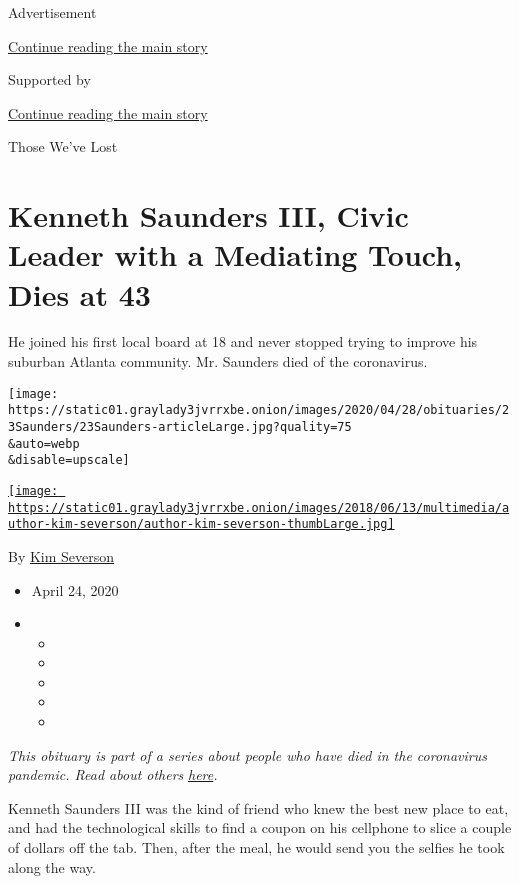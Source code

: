 Advertisement

\protect\hyperlink{after-top}{Continue reading the main story}

Supported by

\protect\hyperlink{after-sponsor}{Continue reading the main story}

Those We've Lost

\hypertarget{kenneth-saunders-iii-civic-leader-with-a-mediating-touch-dies-at-43}{%
\section{Kenneth Saunders III, Civic Leader with a Mediating Touch, Dies
at
43}\label{kenneth-saunders-iii-civic-leader-with-a-mediating-touch-dies-at-43}}

He joined his first local board at 18 and never stopped trying to
improve his suburban Atlanta community. Mr. Saunders died of the
coronavirus.

\texttt{[image: https://static01.graylady3jvrrxbe.onion/images/2020/04/28/obituaries/23Saunders/23Saunders-articleLarge.jpg?quality=75\\\&auto=webp\\\&disable=upscale]}

\href{https://www.nytimes3xbfgragh.onion/by/kim-severson}{\texttt{[image: https://static01.graylady3jvrrxbe.onion/images/2018/06/13/multimedia/author-kim-severson/author-kim-severson-thumbLarge.jpg]}}

By \href{https://www.nytimes3xbfgragh.onion/by/kim-severson}{Kim
Severson}

\begin{itemize}
\item
  April 24, 2020
\item
  \begin{itemize}
  \item
  \item
  \item
  \item
  \item
  \end{itemize}
\end{itemize}

\emph{This obituary is part of a series about people who have died in
the coronavirus pandemic. Read about others}
\href{https://www.nytimes3xbfgragh.onion/series/people-who-have-died-of-the-coronavirus}{\emph{here}}\emph{.}

Kenneth Saunders III was the kind of friend who knew the best new place
to eat, and had the technological skills to find a coupon on his
cellphone to slice a couple of dollars off the tab. Then, after the
meal, he would send you the selfies he took along the way.

